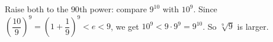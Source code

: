 Raise both to the $90$th power: compare $9^{10}$ with $10^9$. Since $\left(\dfrac{10}9\right)^9=\left(1+\dfrac19\right)^9<e<9$, we get $10^9<9\cdot9^9=9^{10}$. So $\boxed{\sqrt[9]9}$ is larger.
